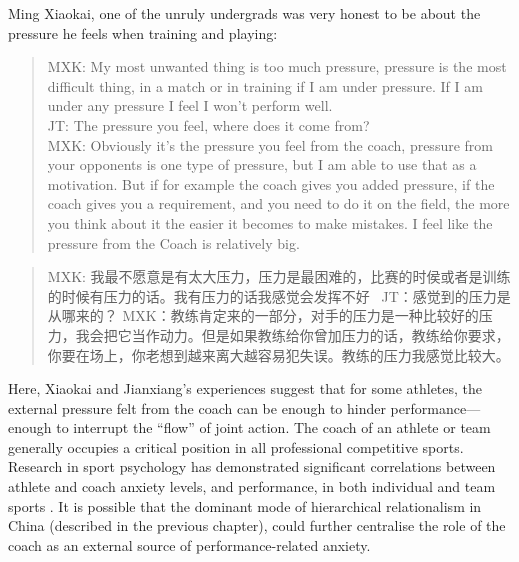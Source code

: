 \begin{CJK}{UTF8}{gbsn}
Ming Xiaokai, one of the unruly undergrads was very honest to be about the pressure he feels when training and playing:

    \begin{quote}
      MXK: My most unwanted thing is too much pressure, pressure is the most difficult thing, in a match or in training if I am under pressure.  If I am under any pressure I feel I won’t perform well. \\
      JT: The pressure you feel, where does it come from? \\
      MXK: Obviously it's the pressure you feel from the coach, pressure from your opponents is one type of pressure, but I am able to use that as a motivation. But if for example the coach gives you added pressure, if the coach gives you a requirement, and you need to do it on the field, the more you think about it the easier it becomes to make mistakes.  I feel like the pressure from the Coach is relatively big.
    \end{quote}

    \begin{quote}
      MXK: 我最不愿意是有太大压力，压力是最困难的，比赛的时侯或者是训练的时候有压力的话。我有压力的话我感觉会发挥不好 
      JT：感觉到的压力是从哪来的？
      MXK：教练肯定来的一部分，对手的压力是一种比较好的压力，我会把它当作动力。但是如果教练给你曾加压力的话，教练给你要求，你要在场上，你老想到越来离大越容易犯失误。教练的压力我感觉比较大。
    \end{quote}

Here, Xiaokai and Jianxiang's experiences suggest that for some athletes, the external pressure felt from the coach can be enough to hinder performance---enough to interrupt the ``flow'' of joint action.   The coach of an athlete or team generally occupies a critical position in all professional competitive sports. Research in sport psychology has demonstrated significant correlations between athlete and coach anxiety levels, and performance, in both individual and team sports \citep[see for example][]{Guillen2009,Mottaghi2013}. It is possible that the dominant mode of hierarchical relationalism in China (described in the previous chapter), could further centralise the role of the coach as an external source of performance-related anxiety.



\end{CJK}
